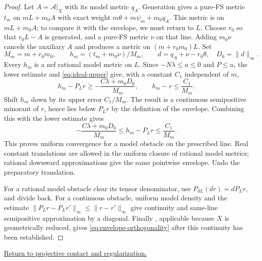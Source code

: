 \documentclass[11pt,reqno]{amsart}
\theoremstyle{definition}
\theoremstyle{remark}
\newtheorem{remark}[theorem]{Remark}
\numberwithin{equation}{section}
\newcommand{\returnlink}[2]{\par\smallskip\noindent
\hyperref[#1]{\textcolor{ReturnLink}{Return to #2.}}\par}
\begin{document}
\begin{proof}
Let $A=\mathcal A|_X$ with its model metric $q_A$. Generation gives
a pure-FS metric $t_m$ on $mL+m_0A$ with exact weight
$m\theta+m\psi_m+m_0q_A$. This metric is on $mL+m_0A$;
to compare it with the envelope, we must return to $L$.
Choose $r_0$ so that $r_0L-A$ is generated, and a pure-FS metric
$\nu$ on that line. Adding $m_0\nu$ cancels the auxiliary $A$
and produces a metric on $(m+r_0m_0)L$. Set
\[
 M_m=m+r_0m_0,\qquad h_m=(t_m+m_0\nu)/M_m,\qquad
 d=q_A+\nu-r_0\theta,\quad D_0=\|d\|_\infty.
\]
Every $h_m$ is a nef rational model metric on $L$. Since
$-N\lambda\leq u\leq0$ and $P\leq u$, the lower estimate and
\eqref{eq:ideal-upper} give, with a constant $C_1$ independent of $m$,
\[
 h_m-P_Lr\geq-\frac{C\lambda+m_0D_0}{M_m},
 \qquad h_m-r\leq\frac{C_1}{M_m}.
\]
Shift $h_m$ down by its upper error $C_1/M_m$. The result is a
continuous semipositive minorant of $r$, hence lies below $P_Lr$
by the definition of the envelope. Combining this with the lower
estimate gives
\begin{equation}\label{eq:envelope-uniform-bound}
 -\frac{C\lambda+m_0D_0}{M_m}
 \leq h_m-P_Lr\leq\frac{C_1}{M_m}.
\end{equation}
This proves uniform convergence for a model obstacle on the prescribed
line. Real constant translations are allowed in the uniform closure
of rational model metrics; rational downward approximations give the
same pointwise envelope. Undo the preparatory translation.

For a rational model obstacle clear its tensor denominator, use
$P_{dL}(dr)=dP_Lr$, and divide back. For a continuous obstacle, uniform
model density and the estimate
$\|P_Lr-P_Lr'\|_\infty\leq\|r-r'\|_\infty$
give continuity and same-line semipositive approximation by a diagonal.
Finally \cite[Theorem~6.7]{BGM}, applicable because $X$ is geometrically
reduced, gives \eqref{eq:envelope-orthogonality} after this continuity
has been established.
\end{proof}

\returnlink{thm:projective-regularization}{projective contact and regularization}
\end{document}
